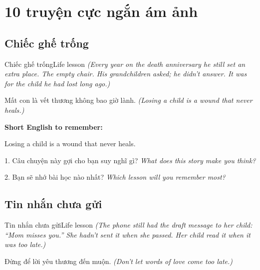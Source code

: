 \chapter{10 truyện cực ngắn ám ảnh}


\section{Chiếc ghế trống}
\begin{truyen}{Chiếc ghế trống}{Life lesson}
\textit{(Every year on the death anniversary he still set an extra place. The empty chair. His grandchildren asked; he didn't answer. It was for the child he had lost long ago.)}
\end{truyen}

\begin{baihoc}
Mất con là vết thương không bao giờ lành.
\textit{(Losing a child is a wound that never heals.)}
\end{baihoc}

\begin{ghinhoanh}
\textbf{Short English to remember:}

Losing a child is a wound that never heals.

\end{ghinhoanh}

\begin{tuhocnhanh}
1. Câu chuyện này gợi cho bạn suy nghĩ gì? \textit{What does this story make you think?}

2. Bạn sẽ nhớ bài học nào nhất? \textit{Which lesson will you remember most?}
\end{tuhocnhanh}
\ngancach


\section{Tin nhắn chưa gửi}
\begin{truyen}{Tin nhắn chưa gửi}{Life lesson}
\textit{(The phone still had the draft message to her child: ``Mom misses you.'' She hadn't sent it when she passed. Her child read it when it was too late.)}
\end{truyen}

\begin{baihoc}
Đừng để lời yêu thương đến muộn.
\textit{(Don't let words of love come too late.)}
\end{baihoc}

